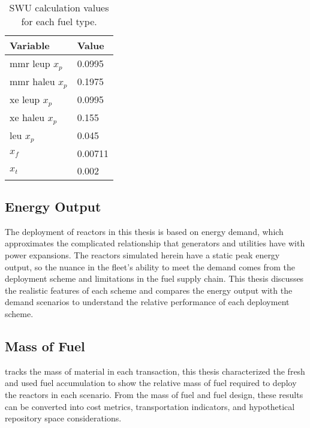 \begin{table}[H]
    \centering
    \caption{SWU calculation values for each fuel type.}
    \label{tab:swu_vals}
    \begin{tabular}{l l}
        \hline
        \textbf{Variable} & \textbf{Value}\\
        \hline
        \gls{mmr} \gls{leup} $x_p$ & 0.0995\\
        \gls{mmr} \gls{haleu} $x_p$ & 0.1975\\
        \gls{xe} \gls{leup} $x_p$ & 0.0995\\
        \gls{xe} \gls{haleu} $x_p$ & 0.155\\
        \gls{leu} $x_p$ & 0.045\\
        $x_f$ & 0.00711\\
        $x_t$ & 0.002\\
        \hline
    \end{tabular}
\end{table}

\subsection{Energy Output}
\label{sec:energy_output}

The deployment of reactors in this thesis is based on energy demand, which
approximates the complicated relationship that generators and utilities
have with power expansions. The reactors simulated herein have a static peak energy output, so the nuance in the fleet's ability to meet the demand comes from the deployment scheme and limitations in the fuel supply chain. This thesis discusses the realistic features of each scheme and compares the energy output with the demand scenarios to understand the relative performance of each deployment scheme.


\subsection{Mass of Fuel}
\label{sec:mass_of_fuel}

\cyclus tracks the mass of material in each transaction, this thesis characterized the fresh and used fuel accumulation to show the relative mass of fuel required to deploy the reactors in each scenario. From the mass of fuel and fuel design, these results can be converted into cost metrics, transportation indicators, and hypothetical repository space considerations.
